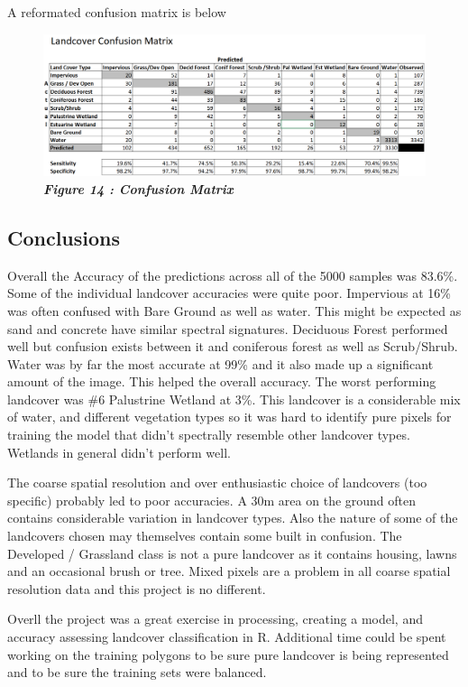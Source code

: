 \documentclass[]{article}
\begin{document}
A reformated confusion matrix is below

\begin{figure}
\centering
\includegraphics{images/ConfMatrix.png}
\caption{\textbf{\emph{Figure 14 : Confusion Matrix}}}
\end{figure}

\subsection{Conclusions}\label{conclusions}

Overall the Accuracy of the predictions across all of the 5000 samples
was 83.6\%. Some of the individual landcover accuracies were quite poor.
Impervious at 16\% was often confused with Bare Ground as well as water.
This might be expected as sand and concrete have similar spectral
signatures. Deciduous Forest performed well but confusion exists between
it and coniferous forest as well as Scrub/Shrub. Water was by far the
most accurate at 99\% and it also made up a significant amount of the
image. This helped the overall accuracy. The worst performing landcover
was \#6 Palustrine Wetland at 3\%. This landcover is a considerable mix
of water, and different vegetation types so it was hard to identify pure
pixels for training the model that didn't spectrally resemble other
landcover types. Wetlands in general didn't perform well.

The coarse spatial resolution and over enthusiastic choice of landcovers
(too specific) probably led to poor accuracies. A 30m area on the ground
often contains considerable variation in landcover types. Also the
nature of some of the landcovers chosen may themselves contain some
built in confusion. The Developed / Grassland class is not a pure
landcover as it contains housing, lawns and an occasional brush or tree.
Mixed pixels are a problem in all coarse spatial resolution data and
this project is no different.

Overll the project was a great exercise in processing, creating a model,
and accuracy assessing landcover classification in R. Additional time
could be spent working on the training polygons to be sure pure
landcover is being represented and to be sure the training sets were
balanced.
\end{document}
